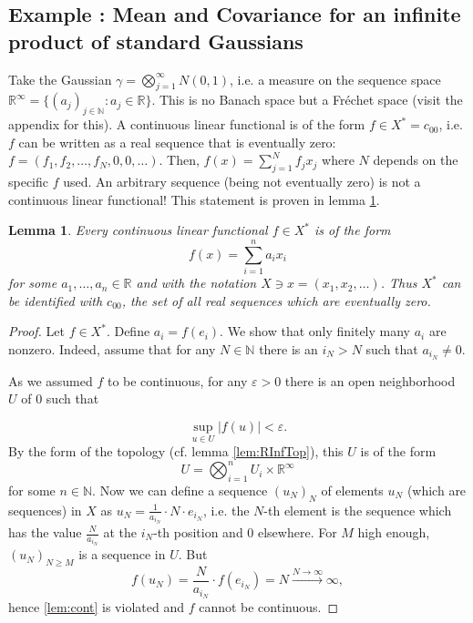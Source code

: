 \documentclass{scrartcl}
\newtheorem{lemma}{Lemma}
\theoremstyle{definition}
\theoremstyle{remark}
\newcommand{\Frechet}{Fr\'echet }
\newcommand{\eps}{\varepsilon}
\newcommand{\N}{\mathbb N}
\newcommand{\R}{\mathbb R}
\newcommand*\circled[1]{\tikz[baseline=(char.base)]{
            \node[shape=circle,draw,inner sep=2pt] (char) {#1};}}
\DeclareRobustCommand{\myboxtwo}[2][blue!20]{%
\begin{tcolorbox}[   %
        breakable,
        left=0pt,
        right=0pt,
        top=0pt,
        bottom=0pt,
        colback=#1,
        colframe=#1,
        width=\dimexpr\textwidth\relax, 
        enlarge left by=0mm,
        boxsep=5pt,
        arc=10pt,outer arc=10pt,
        ]
        #2
\end{tcolorbox}
}
\begin{document}
\myboxtwo{\subsection*{Example \circled{2}: Mean and Covariance for an infinite product of standard Gaussians}
Take the Gaussian $\gamma = \bigotimes_{j=1}^\infty N(0,1)$, i.e. a measure on the sequence space $\R^\infty = \{(a_j)_{j\in\N}: a_j\in \R\}$. This is no Banach space but a \Frechet space (visit the appendix for this). A continuous linear functional is of the form $f\in X^* = c_{00}$, i.e. $f$ can be written as a real sequence that is eventually zero: $f = (f_1, f_2, \ldots, f_N, 0, 0, \ldots)$. Then, $f(x) = \sum_{j=1}^N f_jx_j$ where $N$ depends on the specific $f$ used. An arbitrary sequence (being not eventually zero) is not a continuous linear functional! This statement is proven in lemma \ref{lem:Xstar}.

\begin{lemma}\label{lem:Xstar}
Every continuous linear functional $f\in X^*$ is of the form 
\begin{equation}f(x) = \sum_{i=1}^n a_i x_i \label{eq:darstellung_f} \end{equation}
for some $a_1,\ldots, a_n\in\R$ and with the notation $X \ni x = (x_1, x_2,\ldots)$. Thus $X^*$ can be identified with $c_{00}$, the set of all real sequences which are eventually zero.
\end{lemma}
\begin{proof}
Let $f\in X^*$. Define $a_i = f(e_i)$. We show that only finitely many $a_i$ are nonzero. Indeed, assume that for any $N\in \N$ there is an $i_N > N$ such that $a_{i_N} \neq 0$.

As we assumed $f$ to be continuous, for any $\eps > 0$ there is an open neighborhood $U$ of $0$ such that

 \begin{equation}
\sup_{u\in U} |f(u)| < \eps.  \label{lem:cont}
 \end{equation} 
 By the form of the topology (cf. lemma \ref{lem:RInfTop}), this $U$ is of the form
\[ U =  \bigotimes_{i=1}^n U_i \times \R^\infty \]
for some $n\in \N$. Now we can define a sequence $(u_N)_N$ of elements $u_N$ (which are sequences) in $X$ as $u_N = \frac{1}{a_{i_N}}\cdot N\cdot e_{i_N }$, i.e. the $N$-th element is the sequence which has the value $\frac{N}{a_{i_N}}$ at the $i_N$-th position and $0$ elsewhere. For $M$ high enough, $(u_N)_{N\geq M}$ is a sequence in $U$. But
\[ f(u_N) = \frac{N}{a_{i_N}}\cdot f(e_{i_N}) = N \xrightarrow{N\to\infty} \infty,\]
hence \eqref{lem:cont} is violated and $f$ cannot be continuous.


\end{proof}}
\end{document}
